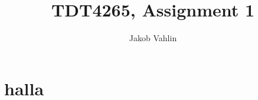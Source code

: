 \documentclass{article}
\date{}
\title{TDT4265, Assignment 1}
\author{Jakob Vahlin}
\begin{document}
\maketitle

\section{halla}
\end{document}

